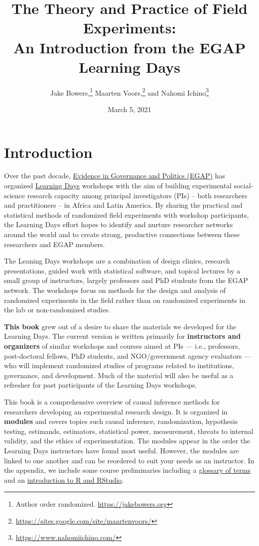 \documentclass[12pt,]{book}
\title{The Theory and Practice of Field Experiments:\\
An Introduction from the EGAP Learning Days}
\author{Jake Bowers,\footnote{Author order randomized. \url{https://jakebowers.org}} Maarten Voors,\footnote{\url{https://sites.google.com/site/maartenvoors/}} and Nahomi Ichino\footnote{\url{https://www.nahomiichino.com/}}}
\date{March 5, 2021}
\begin{document}
\maketitle

\captionsetup[table]{list=no}
\captionsetup[figure]{list=no}

{
\hypersetup{linkcolor=}
\setcounter{tocdepth}{1}
\tableofcontents
}
\hypertarget{introduction}{%
\chapter{Introduction}\label{introduction}}

Over the past decade, \href{http://egap.org/}{Evidence in Governance and Politics (EGAP)} has organized \href{https://egap.org/learning-days/}{Learning Days} workshops with the aim of building experimental social-science research capacity among principal investigators (PIs) -- both researchers and practitioners -- in Africa and Latin America. By sharing the practical and statistical methods of randomized field experiments with workshop participants, the Learning Days effort hopes to identify and nurture researcher networks around the world and to create strong, productive connections between these researchers and EGAP members.

The Leaning Days workshops are a combination of design clinics, research presentations, guided work with statistical software, and topical lectures by a small group of instructors, largely professors and PhD students from the EGAP network. The workshops focus on methods for the design and analysis of randomized experiments in the field rather than on randomized experiments in the lab or non-randomized studies.

\textbf{This book} grew out of a desire to share the materials we developed for the Learning Days. The current version is written primarily for \textbf{instructors and organizers} of similar workshops and courses aimed at PIs --- i.e., professors, post-doctoral fellows, PhD students, and NGO/government agency evaluators --- who will implement randomized studies of programs related to institutions, governance, and development. Much of the material will also be useful as a refresher for past participants of the Learning Days workshops.

This book is a comprehensive overview of causal inference methods for researchers developing an experimental research design. It is organized in \textbf{modules} and covers topics such causal inference, randomization, hypothesis testing, estimands, estimators, statistical power, measurement, threats to internal validity, and the ethics of experimentation. The modules appear in the order the Learning Days instructors have found most useful. However, the modules are linked to one another and can be reordered to suit your needs as an instructor. In the appendix, we include some course preliminaries including a \href{glossary-of-terms.html}{glossary of terms} and an \href{introduction-to-r-and-rstudio.html}{introduction to R and RStudio}.
\end{document}
